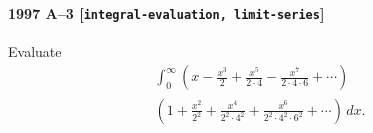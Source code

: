 \paragraph{1997 A--3 \textnormal{[\texttt{integral-evaluation, limit-series}]}}
Evaluate
\begin{gather*}
\int_0^\infty \left(x-\frac{x^3}{2}+\frac{x^5}{2\cdot
4}-\frac{x^7}{2\cdot 4\cdot 6}+\cdots\right) \\
\left(1+\frac{x^2}{2^2}+
\frac{x^4}{2^2\cdot 4^2}+\frac{x^6}{2^2\cdot 4^2 \cdot 6^2}+\cdots\right)\,dx.
\end{gather*}

